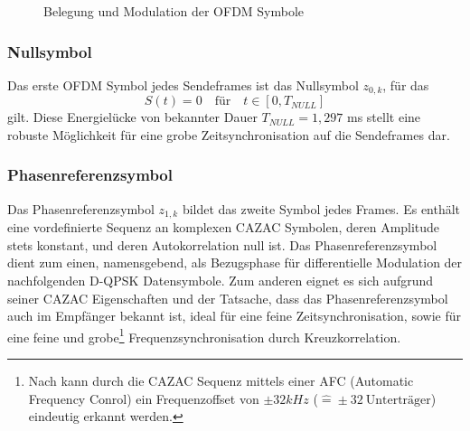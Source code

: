\begin{figure}[htb]
\begin{center}
\end{center}
\caption{Belegung und Modulation der OFDM Symbole}
\label{chart:t_frame}
\end{figure}


\subsubsection{Nullsymbol}
Das erste OFDM Symbol jedes Sendeframes ist das Nullsymbol $z_{0,k}$, für das
\begin{equation}
S(t) = 0 \quad \text{für} \quad t \in [0, T_{NULL}]
\end{equation}
gilt. Diese Energielücke von bekannter Dauer $T_{NULL} = 1,297$ ms stellt eine robuste Möglichkeit für eine grobe Zeitsynchronisation auf die Sendeframes dar.

\subsubsection{Phasenreferenzsymbol}
\label{sec:phasenreferenzsymbol}
Das Phasenreferenzsymbol $z_{1,k}$ bildet das zweite Symbol jedes Frames. Es enthält eine vordefinierte Sequenz an komplexen \ac{CAZAC} Symbolen, deren Amplitude stets konstant, und deren Autokorrelation null ist. Das Phasenreferenzsymbol dient zum einen, namensgebend, als Bezugsphase für differentielle Modulation der nachfolgenden D-QPSK Datensymbole. Zum anderen eignet es sich aufgrund seiner \ac{CAZAC} Eigenschaften und der Tatsache, dass das Phasenreferenzsymbol auch im Empfänger bekannt ist, ideal für eine feine Zeitsynchronisation, sowie für eine feine und grobe\footnote{Nach \cite{dab_buch} kann durch die CAZAC Sequenz mittels einer AFC (Automatic Frequency Conrol) ein Frequenzoffset von $\pm 32kHz$ ($\hat{=} \pm 32 \: \text{Unterträger}$) eindeutig erkannt werden.} Frequenzsynchronisation durch Kreuzkorrelation.

